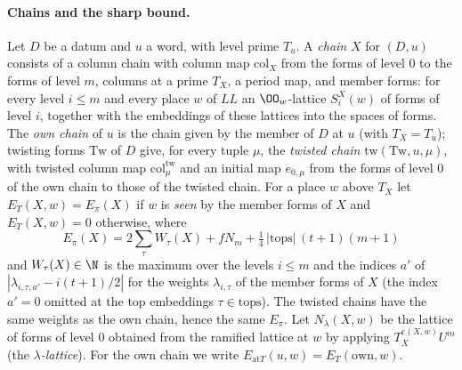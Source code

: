 \paragraph{Chains and the sharp bound.}
Let $D$ be a datum and $u$ a word, with level prime $T_u$. A \emph{chain} $X$ for $(D,u)$ consists of a column chain with
column map $\mathrm{col}_X$ from the forms of level $0$ to the forms of level $m$, columns at a prime $T_X$, a period map, and
member forms: for every level $i\le m$ and every place $w$ of $\mathit{LL}$ an $\OO_w$-lattice $S^X_i(w)$ of forms of level $i$,
together with the embeddings of these lattices into the spaces of forms. The \emph{own chain} of $u$ is the chain given by the
member of $D$ at $u$ (with $T_X=T_u$); twisting forms $\mathrm{Tw}$ of $D$ give, for every tuple $\mu$, the \emph{twisted
chain} $\mathrm{tw}(\mathrm{Tw},u,\mu)$, with twisted column map $\mathrm{col}^{\mathrm{tw}}_\mu$ and an initial map $e_{0,\mu}$
from the forms of level $0$ of the own chain to those of the twisted chain. For a place $w$ above $T_X$ let
$E_T(X,w)=E_\pi(X)$ if $w$ is \emph{seen} by the member forms of $X$ and $E_T(X,w)=0$ otherwise, where
\[
E_\pi(X)=2\sum_\tau W_\tau(X)+fN_m+\tfrac14\,|\mathrm{tops}|\,(t+1)(m+1)
\]
and $W_\tau(X)\in\N$ is the maximum over the levels $i\le m$ and the indices $a'$ of $|\lambda_{i,\tau,a'}-i(t+1)/2|$ for the weights
$\lambda_{i,\tau}$ of the member forms of $X$ (the index $a'=0$ omitted at the top embeddings $\tau\in\mathrm{tops}$). The twisted
chains have the same weights as the own chain, hence the same $E_\pi$. Let $N_\lambda(X,w)$ be the lattice of forms of level $0$
obtained from the ramified lattice at $w$ by applying $T_X^{e(X,w)}U^m$ (the \emph{$\lambda$-lattice}). For the own chain we write
$E_{\mathrm{at}T}(u,w)=E_T(\mathrm{own},w)$.

